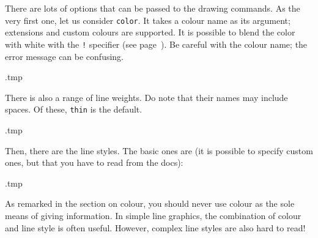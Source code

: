 There are lots of options that can be passed to the drawing commands.
As the very first one, let us consider \verb|color|.
It takes a colour name as its argument;
 extensions and custom colours are supported.
It is possible to blend the color with white with the \verb|!| specifier
(see page~\pageref{ex:color blending}).
Be careful with the colour name; the error message can be confusing.
%
\begin{VerbatimOut}{\jobname.tmp}
\end{VerbatimOut}
\ShowExample

There is also a range of line weights.
Do note that their names may include spaces.
Of these, \verb|thin| is the default.
%
\begin{VerbatimOut}{\jobname.tmp}
\end{VerbatimOut}
\ShowExample

Then, there are the line styles.
The basic ones are (it is possible to specify custom ones, but that you have to read from the docs):
%
\begin{VerbatimOut}{\jobname.tmp}
\end{VerbatimOut}
\ShowExample

\begin{practices}
As remarked in the section on colour,
you should never use colour as the sole means of giving information.
In simple line graphics, the combination of colour and line style is often useful.
However, complex line styles are also hard to read!
\end{practices}


